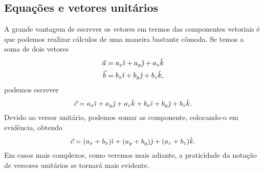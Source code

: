 \subsection{Equações e vetores unitários}

A grande vantagem de escrever os vetores em termos das componentes vetoriais é que podemos realizar cálculos de uma maneira bastante cômoda. Se temos a soma de dois vetores 
\begin{align}
  \vec{a} &= a_x \hat{\imath} + a_y \hat{\jmath} + a_z \hat{k} \\
  \vec{b} &= b_x \hat{\imath} + b_y \hat{\jmath} + b_z \hat{k},
\end{align}
%
podemos escrever
\begin{equation}
  \vec{c} = a_x \hat{\imath} + a_y \hat{\jmath} + a_z \hat{k} + b_x \hat{\imath} + b_y \hat{\jmath} + b_z \hat{k}.
\end{equation}
%
Devido ao versor unitário, podemos somar as componente, colocando-o em evidência, obtendo
\begin{equation}
  \vec{c} = (a_x + b_x) \hat{\imath} + (a_y + b_y) \hat{\jmath} + (a_z + b_z)\hat{k}.
\end{equation}
%
Em casos mais complexos, como veremos mais adiante, a praticidade da notação de versores unitários se tornará mais evidente.
